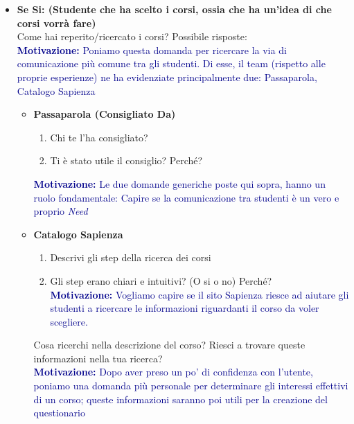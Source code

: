\begin{itemize}
\begin{itemize}
\begin{itemize}
            \item \textbf{Se Si: (Studente che ha scelto i corsi, ossia che ha un’idea di che corsi vorrà fare)}\\
            Come hai reperito/ricercato i corsi? Possibile risposte:\\
            \textcolor{darkblue}{\textbf{Motivazione:} Poniamo questa domanda per ricercare la via di comunicazione più comune tra gli studenti. 
            Di esse, il team (rispetto alle proprie esperienze) ne ha evidenziate principalmente due: Passaparola, Catalogo Sapienza}

            \begin{itemize}
                \item \textbf{Passaparola (Consigliato Da)}
                \begin{enumerate}
                    \item Chi te l'ha consigliato?
                    \item Ti è stato utile il consiglio? Perché?
                \end{enumerate}
                \textcolor{darkblue}{\textbf{Motivazione:} Le due domande generiche poste qui sopra, hanno un ruolo fondamentale: Capire se la comunicazione tra studenti è un vero e proprio \textit{Need}}

                \item \textbf{Catalogo Sapienza}
                \begin{enumerate}
                    \item Descrivi gli step della ricerca dei corsi
                    \item Gli step erano chiari e intuitivi? (O si o no) Perché?\\
                    \textcolor{darkblue}{\textbf{Motivazione:} Vogliamo capire se il sito Sapienza riesce ad aiutare gli studenti a ricercare le informazioni riguardanti il corso da voler scegliere.}
                \end{enumerate}
                Cosa ricerchi nella descrizione del corso? Riesci a trovare queste informazioni nella tua ricerca?\\
                \textcolor{darkblue}{\textbf{Motivazione:} Dopo aver preso un po' di confidenza con l'utente, poniamo una domanda più personale per determinare gli interessi 
                effettivi di un corso; queste informazioni saranno poi utili per la creazione del questionario}
            \end{itemize}
            

\end{itemize}
\end{itemize}
\end{itemize}
